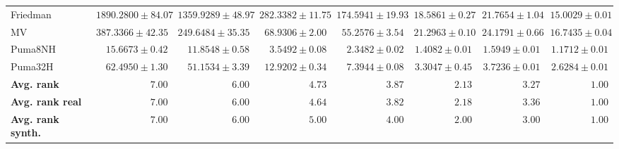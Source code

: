 \begin{table*}[!htbp]
{\begin{tabular}{lrrrrrrr}
		Friedman & $1890.2800 \pm 84.07$ & $1359.9289 \pm 48.97$ & $282.3382 \pm 11.75$ & $174.5941 \pm 19.93$ & $18.5861 \pm 0.27$ & $21.7654 \pm 1.04$ & $\mathbf{15.0029 \pm 0.01}$\\
		MV & $387.3366 \pm 42.35$ & $249.6484 \pm 35.35$ & $68.9306 \pm 2.00$ & $55.2576 \pm 3.54$ & $21.2963 \pm 0.10$ & $24.1791 \pm 0.66$ & $\mathbf{16.7435 \pm 0.04}$\\
		Puma8NH & $15.6673 \pm 0.42$ & $11.8548 \pm 0.58$ & $3.5492 \pm 0.08$ & $2.3482 \pm 0.02$ & $1.4082 \pm 0.01$ & $1.5949 \pm 0.01$ & $\mathbf{1.1712 \pm 0.01}$\\
		Puma32H & $62.4950 \pm 1.30$ & $51.1534 \pm 3.39$ & $12.9202 \pm 0.34$ & $7.3944 \pm 0.08$ & $3.3047 \pm 0.45$ & $3.7236 \pm 0.01$ & $\mathbf{2.6284 \pm 0.01}$\\
		\midrule
		\textbf{{Avg. rank}} & $7.00$ & $6.00$ & $4.73$ & $3.87$ & $2.13$ & $3.27$ & $\mathbf{1.00}$\\
		\textbf{{Avg. rank real}} & $7.00$ & $6.00$ & $4.64$ & $3.82$ & $2.18$ & $3.36$ & $\mathbf{1.00}$\\
		\textbf{{Avg. rank synth.}} & $7.00$ & $6.00$ & $5.00$ & $4.00$ & $2.00$ & $3.00$ & $\mathbf{1.00}$\\
		\bottomrule
	\end{tabular}}
\end{table*}
